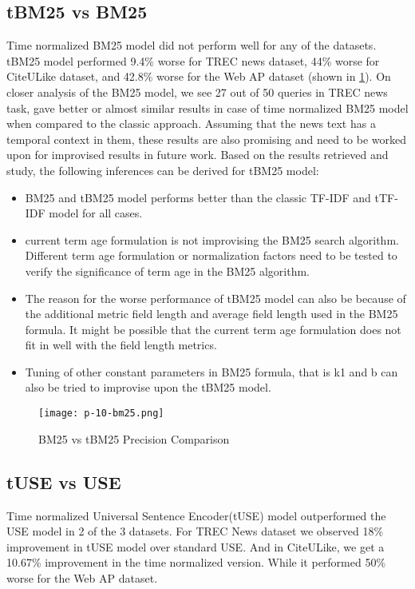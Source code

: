 \subsection{tBM25 vs BM25}
Time normalized BM25 model did not perform well for any of the datasets. tBM25 model performed 9.4\% worse for TREC news dataset, 44\% worse for CiteULike dataset, and 42.8\% worse for the Web AP dataset (shown in \ref{fig:bm25-precision-comparison}).
On closer analysis of the BM25 model, we see 27 out of 50 queries in TREC news task, gave better or almost similar results in case of time normalized BM25 model when compared to the classic approach. Assuming that the news text has a temporal context in them, these results are also promising and need to be worked upon for improvised results in future work.
Based on the results retrieved and study, the following inferences can be derived for tBM25 model:
\begin{itemize}
    \item BM25 and tBM25 model performs better than the classic TF-IDF and tTF-IDF model for all cases. 
    \item current term age formulation is not improvising the BM25 search algorithm. Different term age formulation or normalization factors need to be tested to verify the significance of term age in the BM25 algorithm.
    \item The reason for the worse performance of tBM25 model can also be because of the additional metric field length and average field length used in the BM25 formula. It might be possible that the current term age formulation does not fit in well with the field length metrics.
    \item Tuning of other constant parameters in BM25 formula, that is k1 and b can also be tried to improvise upon the tBM25 model.
\end{itemize}
\begin{figure} [h!]
    \centering
    \texttt{[image: p-10-bm25.png]}
    \caption{BM25 vs tBM25 Precision Comparison}
    \label{fig:bm25-precision-comparison}
\end{figure}
\subsection{tUSE vs USE}
Time normalized Universal Sentence Encoder(tUSE) model outperformed the USE model in 2 of the 3 datasets. For TREC News dataset we observed 18\% improvement in tUSE model over standard USE. And in CiteULike, we get a 10.67\% improvement in the time normalized version. While it performed 50\% worse for the Web AP dataset. 

